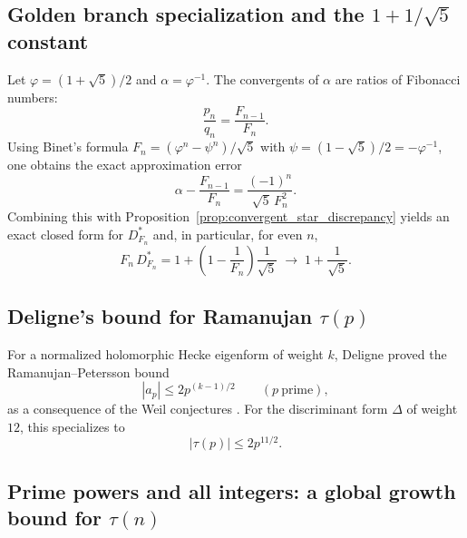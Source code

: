 \subsection{Golden branch specialization and the \texorpdfstring{$1+1/\sqrt{5}$}{1+1/sqrt(5)} constant}
\label{app:golden_constant}

Let $\varphi=(1+\sqrt{5})/2$ and $\alpha=\varphi^{-1}$. The convergents of $\alpha$ are ratios of Fibonacci numbers:
\begin{equation}
\frac{p_n}{q_n}=\frac{F_{n-1}}{F_n}.
\end{equation}
Using Binet's formula $F_n=(\varphi^n-\psi^n)/\sqrt{5}$ with $\psi=(1-\sqrt{5})/2=-\varphi^{-1}$, one obtains the exact approximation error
\begin{equation}
\alpha-\frac{F_{n-1}}{F_n}=\frac{(-1)^{n}}{\sqrt{5}\,F_n^2}.
\end{equation}
Combining this with Proposition~\ref{prop:convergent_star_discrepancy} yields an exact closed form for $D_{F_n}^\ast$ and, in particular, for even $n$,
\begin{equation}
F_n\,D_{F_n}^\ast = 1+\left(1-\frac{1}{F_n}\right)\frac{1}{\sqrt{5}}
\;\longrightarrow\;
1+\frac{1}{\sqrt{5}}.
\end{equation}

\subsection{Deligne's bound for Ramanujan \texorpdfstring{$\tau(p)$}{tau(p)}}
\label{app:deligne_bound}

For a normalized holomorphic Hecke eigenform of weight $k$, Deligne proved the Ramanujan--Petersson bound
\begin{equation}
|a_p|\le 2p^{(k-1)/2}\qquad (p\ \text{prime}),
\end{equation}
as a consequence of the Weil conjectures \cite{Deligne1974}. For the discriminant form $\Delta$ of weight $12$, this specializes to
\begin{equation}
|\tau(p)|\le 2p^{11/2}.
\end{equation}

\subsection{Prime powers and all integers: a global growth bound for \texorpdfstring{$\tau(n)$}{tau(n)}}
\label{app:tau_global_bound}

